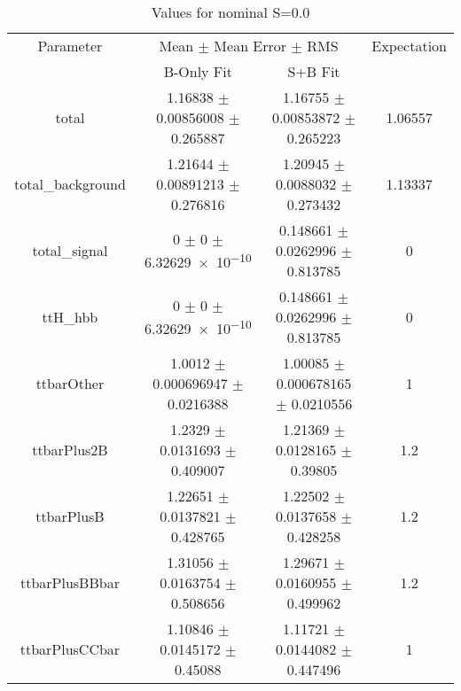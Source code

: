 \begin{table}
\centering
\caption{Values for nominal S=0.0}
\begin{tabular}{cccc}
\toprule
Parameter & \multicolumn{2}{c}{Mean $\pm$ Mean Error $\pm$ RMS} & Expectation\\
 & B-Only Fit & S+B Fit & \\
\midrule
total & \num{1.16838} $\pm$ \num{0.00856008} $\pm$ \num{0.265887} & \num{1.16755} $\pm$ \num{0.00853872} $\pm$ \num{0.265223} & \num{1.06557}\\
total\_background & \num{1.21644} $\pm$ \num{0.00891213} $\pm$ \num{0.276816} & \num{1.20945} $\pm$ \num{0.0088032} $\pm$ \num{0.273432} & \num{1.13337}\\
total\_signal & \num{0} $\pm$ \num{0} $\pm$ \num{6.32629e-10} & \num{0.148661} $\pm$ \num{0.0262996} $\pm$ \num{0.813785} & \num{0}\\
ttH\_hbb & \num{0} $\pm$ \num{0} $\pm$ \num{6.32629e-10} & \num{0.148661} $\pm$ \num{0.0262996} $\pm$ \num{0.813785} & \num{0}\\
ttbarOther & \num{1.0012} $\pm$ \num{0.000696947} $\pm$ \num{0.0216388} & \num{1.00085} $\pm$ \num{0.000678165} $\pm$ \num{0.0210556} & \num{1}\\
ttbarPlus2B & \num{1.2329} $\pm$ \num{0.0131693} $\pm$ \num{0.409007} & \num{1.21369} $\pm$ \num{0.0128165} $\pm$ \num{0.39805} & \num{1.2}\\
ttbarPlusB & \num{1.22651} $\pm$ \num{0.0137821} $\pm$ \num{0.428765} & \num{1.22502} $\pm$ \num{0.0137658} $\pm$ \num{0.428258} & \num{1.2}\\
ttbarPlusBBbar & \num{1.31056} $\pm$ \num{0.0163754} $\pm$ \num{0.508656} & \num{1.29671} $\pm$ \num{0.0160955} $\pm$ \num{0.499962} & \num{1.2}\\
ttbarPlusCCbar & \num{1.10846} $\pm$ \num{0.0145172} $\pm$ \num{0.45088} & \num{1.11721} $\pm$ \num{0.0144082} $\pm$ \num{0.447496} & \num{1}\\
\bottomrule
\end{tabular}
\end{table}